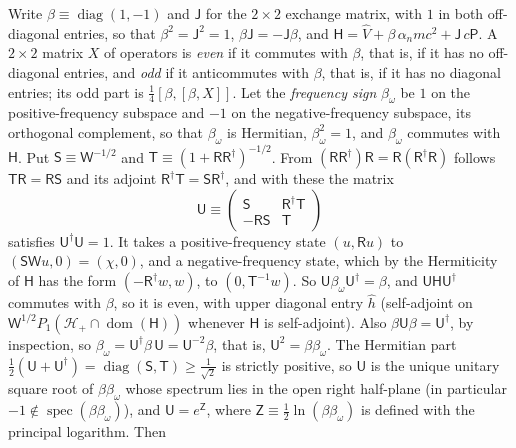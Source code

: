 \documentclass[aps,prd,onecolumn,tightenlines,nofootinbib,notitlepage,11pt,floatfix]{revtex4-2}
\theoremstyle{indentedtheorem}
\begin{document}
Write $\beta\equiv\operatorname{diag}(1,-1)$ and $\mathsf{J}$ for the $2\times2$ exchange matrix, with $1$ in both off-diagonal entries, so that $\beta^2=\mathsf{J}^2=1$, $\beta\mathsf{J}=-\mathsf{J}\beta$, and $\mathsf{H}=\hat{V}+\beta\,\alpha_nmc^2+\mathsf{J}\,c\mathsf{P}$. A $2\times2$ matrix $X$ of operators is \emph{even} if it commutes with $\beta$, that is, if it has no off-diagonal entries, and \emph{odd} if it anticommutes with $\beta$, that is, if it has no diagonal entries; its odd part is $\tfrac{1}{4}[\beta,[\beta,X]]$. Let the \emph{frequency sign} $\beta_\omega$ be $1$ on the positive-frequency subspace and $-1$ on the negative-frequency subspace, its orthogonal complement, so that $\beta_\omega$ is Hermitian, $\beta_\omega^2=1$, and $\beta_\omega$ commutes with $\mathsf{H}$. Put $\mathsf{S}\equiv\mathsf{W}^{-1/2}$ and $\mathsf{T}\equiv(1+\mathsf{R}\mathsf{R}^\dagger)^{-1/2}$. From $(\mathsf{R}\mathsf{R}^\dagger)\mathsf{R}=\mathsf{R}(\mathsf{R}^\dagger\mathsf{R})$ follows $\mathsf{T}\mathsf{R}=\mathsf{R}\mathsf{S}$ and its adjoint $\mathsf{R}^\dagger\mathsf{T}=\mathsf{S}\mathsf{R}^\dagger$, and with these the matrix
\begin{equation}
    \mathsf{U} \equiv \begin{pmatrix} \mathsf{S} & \mathsf{R}^\dagger\mathsf{T} \\ -\mathsf{R}\mathsf{S} & \mathsf{T} \end{pmatrix}
    \label{eq:rotation}
\end{equation}
satisfies $\mathsf{U}^\dagger\mathsf{U}=1$. It takes a positive-frequency state $(u,\mathsf{R}u)$ to $(\mathsf{S}\mathsf{W}u,0)=(\chi,0)$, and a negative-frequency state, which by the Hermiticity of $\mathsf{H}$ has the form $(-\mathsf{R}^\dagger w,w)$, to $(0,\mathsf{T}^{-1}w)$. So $\mathsf{U}\beta_\omega\mathsf{U}^\dagger=\beta$, and $\mathsf{U}\mathsf{H}\mathsf{U}^\dagger$ commutes with $\beta$, so it is even, with upper diagonal entry $\hat{h}$ (self-adjoint on $\mathsf{W}^{1/2}P_1(\mathcal{H}_+\cap\operatorname{dom}(\mathsf{H}))$ whenever $\mathsf{H}$ is self-adjoint). Also $\beta\mathsf{U}\beta=\mathsf{U}^\dagger$, by inspection, so $\beta_\omega=\mathsf{U}^\dagger\beta\,\mathsf{U}=\mathsf{U}^{-2}\beta$, that is, $\mathsf{U}^2=\beta\beta_\omega$. The Hermitian part $\tfrac{1}{2}(\mathsf{U}+\mathsf{U}^\dagger)=\operatorname{diag}(\mathsf{S},\mathsf{T})\ge\tfrac{1}{\sqrt{2}}$ is strictly positive, so $\mathsf{U}$ is the unique unitary square root of $\beta\beta_\omega$ whose spectrum lies in the open right half-plane (in particular $-1\notin\operatorname{spec}(\beta\beta_\omega)$), and $\mathsf{U}=e^{\mathsf{Z}}$, where $\mathsf{Z}\equiv\tfrac{1}{2}\ln(\beta\beta_\omega)$ is defined with the principal logarithm. Then
\end{document}
